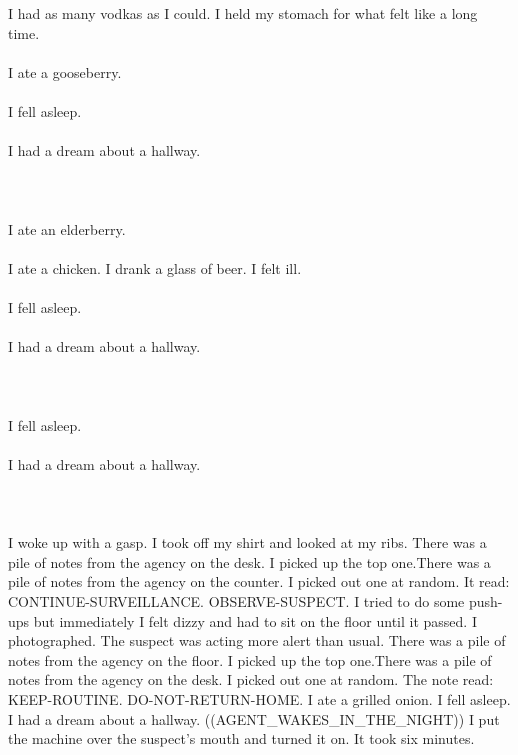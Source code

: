 \documentclass{article}
\begin{document}
    \section{}
    I had as many vodkas as I could. I held my stomach for what felt like a long time.\\\\I ate a gooseberry.\\\\I fell asleep.\\\\I had a dream about a hallway.\\\\ 
    \newpage
    
    \section{}
    I ate an elderberry.\\\\I ate a chicken. I drank a glass of beer. I felt ill.\\\\I fell asleep.\\\\I had a dream about a hallway.\\\\ 
    \newpage
    
    \section{}
    I fell asleep.\\\\I had a dream about a hallway.\\\\ 
    \newpage
    
    \section{}
    I woke up with a gasp. I took off my shirt and looked at my ribs. There was a pile of notes from the agency on the desk. I picked up the top one.There was a pile of notes from the agency on the counter. I picked out one at random. It read: CONTINUE-SURVEILLANCE. OBSERVE-SUSPECT. I tried to do some push-ups but immediately I felt dizzy and had to sit on the floor until it passed. I photographed. The suspect was acting more alert than usual. There was a pile of notes from the agency on the floor. I picked up the top one.There was a pile of notes from the agency on the desk. I picked out one at random. The note read: KEEP-ROUTINE. DO-NOT-RETURN-HOME. I ate a grilled onion. I fell asleep. I had a dream about a hallway. ((AGENT_WAKES_IN_THE_NIGHT)) I put the machine over the suspect's mouth and turned it on. It took six minutes. \\\\
    \newpage
    
\end{document}
